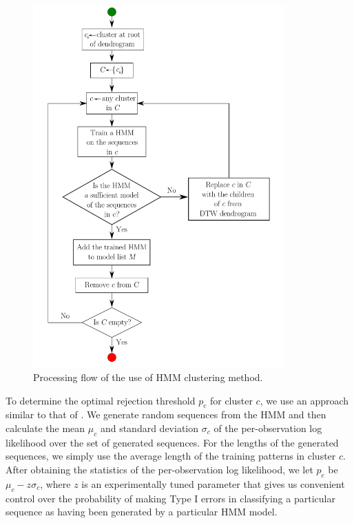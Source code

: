 
\begin{figure}[t]
  \begin{center} \includegraphics[width=3.8in]{figures/clustering-flow-diagram} \end{center} \caption[Processing
    flow of the use of HMM clustering method.]{\small Processing flow
    of the use of HMM clustering method.}  \label{fig:flow-diagram}
\end{figure}

To determine the optimal rejection threshold $p_c$ for cluster $c$, we
use an approach similar to that of .  We
generate random sequences from the HMM and then calculate the mean
$\mu_c$ and standard deviation $\sigma_c$ of the per-observation log
likelihood over the set of generated sequences.  For the lengths of
the generated sequences, we simply use the average length of the
training patterns in cluster $c$.  After obtaining the statistics of
the per-observation log likelihood, we let $p_c$ be $\mu_c -
z \sigma_c$, where $z$ is an experimentally tuned parameter that gives
us convenient control over the probability of making Type I errors in
classifying a particular sequence as having been generated by a
particular HMM model.

